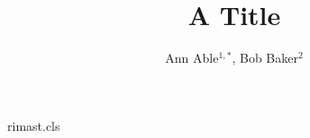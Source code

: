 \begin{filecontents*}[overwrite]{rimast.cls}
\renewcommand{\author}[1]{{\raggedright #1\par}}
\newcommand{\affil}[1]{{\small\raggedright #1}}
\end{filecontents*}
\documentclass{rimast}

\title{A Title}
\author{Ann Able$^{1,*}$, Bob Baker$^{2}$}




\maketitle
Text.

